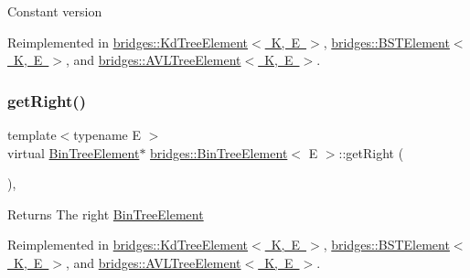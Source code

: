 Constant version 

Reimplemented in \mbox{\hyperlink{classbridges_1_1_kd_tree_element_ab58af4ca67cb3869c279bfc11952c070}{bridges\+::\+Kd\+Tree\+Element$<$ K, E $>$}}, \mbox{\hyperlink{classbridges_1_1_b_s_t_element_a2abcfb991f6cc377da2bd9217319fc9c}{bridges\+::\+B\+S\+T\+Element$<$ K, E $>$}}, and \mbox{\hyperlink{classbridges_1_1_a_v_l_tree_element_a61e075db5414b7bd6f52d657401acda3}{bridges\+::\+A\+V\+L\+Tree\+Element$<$ K, E $>$}}.

\mbox{\label{classbridges_1_1_bin_tree_element_a5751f2fe38e2364f68dc37939fce060f}} 
\subsubsection{\texorpdfstring{get\+Right()}{getRight()}\hspace{0.1cm}{\footnotesize\ttfamily [1/2]}}
{\footnotesize\ttfamily template$<$typename E $>$ \\
virtual \mbox{\hyperlink{classbridges_1_1_bin_tree_element}{Bin\+Tree\+Element}}$\ast$ \mbox{\hyperlink{classbridges_1_1_bin_tree_element}{bridges\+::\+Bin\+Tree\+Element}}$<$ E $>$\+::get\+Right (\begin{DoxyParamCaption}{ }\end{DoxyParamCaption})\hspace{0.3cm}{\ttfamily [inline]}, {\ttfamily [virtual]}}

\begin{DoxyReturn}{Returns}
The right \mbox{\hyperlink{classbridges_1_1_bin_tree_element}{Bin\+Tree\+Element}} 
\end{DoxyReturn}


Reimplemented in \mbox{\hyperlink{classbridges_1_1_kd_tree_element_a8e1090891a720231c2009d1d222471e9}{bridges\+::\+Kd\+Tree\+Element$<$ K, E $>$}}, \mbox{\hyperlink{classbridges_1_1_b_s_t_element_a35e93bce32de933522dccde5f2b5ffd9}{bridges\+::\+B\+S\+T\+Element$<$ K, E $>$}}, and \mbox{\hyperlink{classbridges_1_1_a_v_l_tree_element_a909b46ebf3e8c6a3434762a1f01499e2}{bridges\+::\+A\+V\+L\+Tree\+Element$<$ K, E $>$}}.

\mbox{\label{classbridges_1_1_bin_tree_element_aa01980f4be18f6c205580ea0376a0d07}} 
